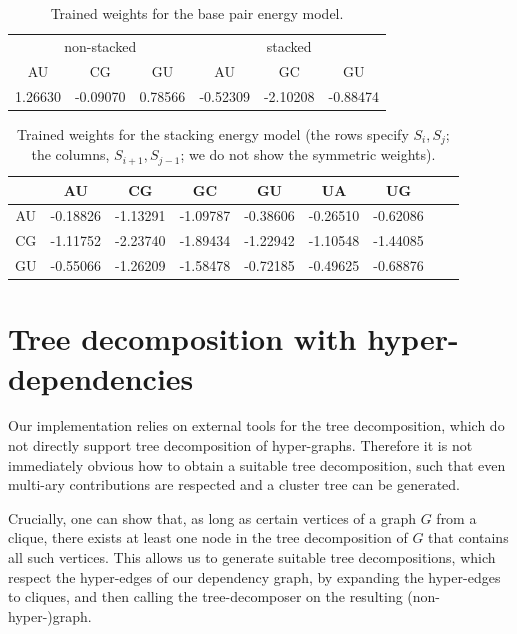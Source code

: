 \documentclass[10pt]{article}
\begin{document}
\begin{table}[b]
  \centering
  \caption{Trained weights for the base pair energy model.}
  \label{tab:basepairmodel}
  \begin{tabular}{c@{\quad}c@{\quad}c@{\quad}|@{\quad}c@{\quad}c@{\quad}c}
    \multicolumn{3}{c}{non-stacked} & \multicolumn{3}{c}{stacked}\\
    AU      & CG       & GU      & AU       & GC       & GU \\\hline
    1.26630 & -0.09070 & 0.78566 & -0.52309 & -2.10208 & -0.88474
  \end{tabular}
\end{table}


\begin{table}[b]
  \centering
  \caption{Trained weights for the stacking energy model (the rows specify $S_i,S_j$; the columns, $S_{i+1},S_{j-1}$; we do not show the symmetric weights).}
  \label{tab:stackingmodel}
  \begin{tabular}{c@{\quad}|@{\quad}c@{\quad}c@{\quad}c@{\quad}c@{\quad}c@{\quad}c@{\quad}c@{\quad}c}
       & AU & CG & GC & GU & UA & UG \\\hline
    AU &
-0.18826 &
-1.13291 &
-1.09787 &
-0.38606 &
-0.26510 &
-0.62086
    \\
    CG &
-1.11752 &
-2.23740 &
-1.89434 &
-1.22942 &
-1.10548 &
-1.44085
    \\
    GU &
-0.55066 &
-1.26209 &
-1.58478 &
-0.72185 &
-0.49625 &
-0.68876
    \\
  \end{tabular}
\end{table}

\section{Tree decomposition with hyper-dependencies}
\label{appsec:dependency-cliques}

Our implementation relies on external tools for the tree decomposition, which do not directly support tree decomposition of hyper-graphs. Therefore it is not immediately obvious how 
to obtain a suitable tree decomposition, such that even multi-ary contributions are respected and a cluster tree can be generated.

Crucially, one can show that, as long as certain vertices of a graph $G$ from a clique, there exists at least one node in the tree decomposition of $G$ that contains all such vertices.
%
This allows us to generate suitable tree decompositions, which respect the hyper-edges of our dependency graph, by expanding the hyper-edges to cliques, and then calling the tree-decomposer on the resulting (non-hyper-)graph.
\end{document}
